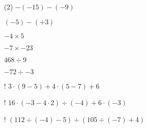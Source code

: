 \documentclass[]{srs}
\begin{document}
\begin{preguntas}(2)
\pregunta $-\left(-15\right)-\left(-9\right)$
\begin{malla}[height=5cm]
\end{malla}
\pregunta $\left(-5\right)-\left(+3\right)$
\begin{malla}[height=5cm]
\end{malla}
\pregunta $-4\times 5$
\begin{malla}[height=5cm]
\end{malla}
\pregunta $-7\times -23$
\begin{malla}[height=5cm]
\end{malla}
\pregunta $468\div 9$
\begin{malla}[height=5cm]
\end{malla}
\pregunta $-72\div -3$
\begin{malla}[height=5cm]
\end{malla}
\pregunta! $3\cdot\left(9-5\right)+4\cdot\left(5-7\right)+6$
\begin{malla}[height=6cm]
\end{malla}
\pregunta! $16\cdot\left(-3-4\cdot 2\right)\div\left(-4\right) +6\cdot\left(-3\right)$
\begin{malla}[height=6cm]
\end{malla}
\pregunta! $\left(112\div\left(-4\right)-5\right)\div\left(105\div\left(-7\right)+4\right)$
\begin{malla}[height=6cm]
\end{malla}

\end{preguntas}
\end{document}
